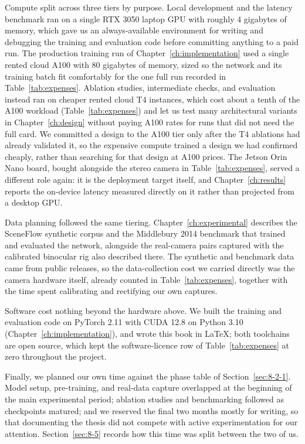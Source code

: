 Compute split across three tiers by purpose. Local development and the
latency benchmark ran on a single RTX 3050 laptop GPU with roughly 4
gigabytes of memory, which gave us an always-available environment for
writing and debugging the training and evaluation code before
committing anything to a paid run. The production training run of
Chapter~\ref{ch:implementation} used a single rented cloud A100 with 80
gigabytes of memory, sized so the network and its training batch fit
comfortably for the one full run recorded in Table~\ref{tab:expenses}.
Ablation studies, intermediate checks, and evaluation instead ran on
cheaper rented cloud T4 instances, which cost about a tenth of the A100
workload (Table~\ref{tab:expenses}) and let us test many architectural
variants in Chapter~\ref{ch:design} without paying A100 rates for runs
that did not need the full card. We committed a design to the A100 tier
only after the T4 ablations had already validated it, so the expensive
compute trained a design we had confirmed cheaply, rather than
searching for that design at A100 prices. The Jetson Orin Nano board,
bought alongside the stereo camera in Table~\ref{tab:expenses}, served
a different role again: it is the deployment target itself, and
Chapter~\ref{ch:results} reports the on-device latency measured
directly on it rather than projected from a desktop GPU.

Data planning followed the same tiering. Chapter~\ref{ch:experimental}
describes the SceneFlow synthetic corpus and the Middlebury 2014
benchmark that trained and evaluated the network, alongside the
real-camera pairs captured with the calibrated binocular rig also
described there. The synthetic and benchmark data came from public
releases, so the data-collection cost we carried directly was the
camera hardware itself, already counted in Table~\ref{tab:expenses},
together with the time spent calibrating and rectifying our own
captures.

Software cost nothing beyond the hardware above. We built the training
and evaluation code on PyTorch 2.11 with CUDA 12.8 on Python 3.10
(Chapter~\ref{ch:implementation}), and wrote this book in LaTeX; both
toolchains are open source, which kept the software-licence row of
Table~\ref{tab:expenses} at zero throughout the project.

Finally, we planned our own time against the phase table of
Section~\ref{sec:8-2-1}. Model setup, pre-training, and real-data
capture overlapped at the beginning of the main experimental period; ablation studies
and benchmarking followed as checkpoints matured; and we reserved the
final two months mostly for writing, so that documenting the thesis did
not compete with active experimentation for our attention.
Section~\ref{sec:8-5} records how this time was split between the two
of us.

